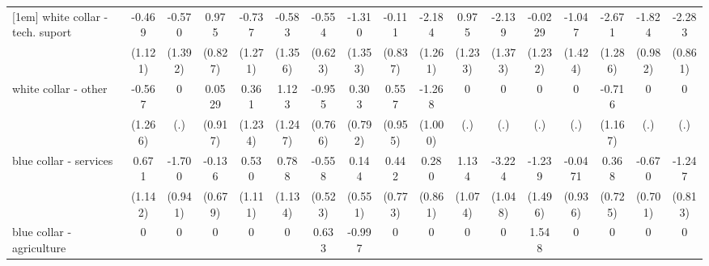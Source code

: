 {\begin{tabular}{l*{16}{c}}
[1em]
white collar - tech. suport&      -0.469         &      -0.570         &       0.975         &      -0.737         &      -0.583         &      -0.554         &      -1.310         &      -0.111         &      -2.184         &       0.975         &      -2.139         &     -0.0229         &      -1.047         &      -2.671\sym{*}  &      -1.824         &      -2.283\sym{**} \\
                    &     (1.121)         &     (1.392)         &     (0.827)         &     (1.271)         &     (1.356)         &     (0.623)         &     (1.353)         &     (0.837)         &     (1.261)         &     (1.233)         &     (1.373)         &     (1.232)         &     (1.424)         &     (1.286)         &     (0.982)         &     (0.861)         \\
[1em]
white collar - other&      -0.567         &           0         &      0.0529         &       0.361         &       1.123         &      -0.955         &       0.303         &       0.557         &      -1.268         &           0         &           0         &           0         &           0         &      -0.716         &           0         &           0         \\
                    &     (1.266)         &         (.)         &     (0.917)         &     (1.234)         &     (1.247)         &     (0.766)         &     (0.792)         &     (0.955)         &     (1.000)         &         (.)         &         (.)         &         (.)         &         (.)         &     (1.167)         &         (.)         &         (.)         \\
[1em]
blue collar - services&       0.671         &      -1.700         &      -0.136         &       0.530         &       0.788         &      -0.558         &       0.144         &       0.442         &       0.280         &       1.134         &      -3.224\sym{**} &      -1.239         &     -0.0471         &       0.368         &      -0.670         &      -1.247         \\
                    &     (1.142)         &     (0.941)         &     (0.679)         &     (1.111)         &     (1.134)         &     (0.523)         &     (0.551)         &     (0.773)         &     (0.861)         &     (1.074)         &     (1.048)         &     (1.496)         &     (0.936)         &     (0.725)         &     (0.701)         &     (0.813)         \\
[1em]
blue collar - agriculture&           0         &           0         &           0         &           0         &           0         &       0.633         &      -0.997         &           0         &           0         &           0         &           0         &       1.548         &           0         &           0         &           0         &           0         \\

\end{tabular}}
